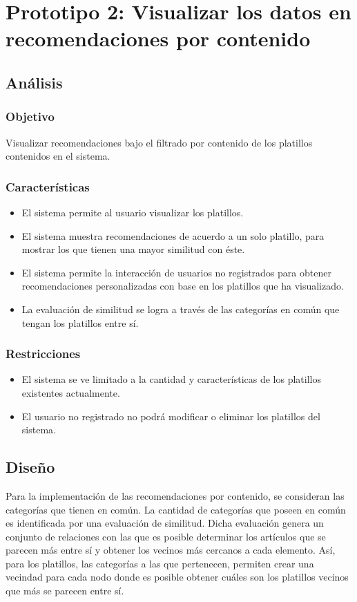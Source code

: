 \chapter{Prototipo 2: Visualizar los datos en recomendaciones por contenido}
  \section{Análisis}
    \subsection{Objetivo}
      Visualizar recomendaciones bajo el filtrado por contenido de los platillos contenidos en el sistema. 

    \subsection{Características}
    \begin{itemize}
      \item El sistema permite al usuario visualizar los platillos.
      \item El sistema muestra recomendaciones de acuerdo a un solo platillo, para mostrar los que tienen una mayor similitud con éste.
      \item El sistema permite la interacción de usuarios no registrados para obtener recomendaciones personalizadas con base en los platillos que ha visualizado.
      \item La evaluación de similitud se logra a través de las categorías en común que tengan los platillos entre sí.
    \end{itemize}

    \subsection{Restricciones}
    \begin{itemize}
      \item El sistema se ve limitado a la cantidad y características de los platillos existentes actualmente.
      \item El usuario no registrado no podrá modificar o eliminar los platillos del sistema.
    \end{itemize}

  \section{Diseño}
    Para la implementación de las recomendaciones por contenido, se consideran las categorías que tienen en común. La cantidad de categorías que poseen en común es identificada por una evaluación de similitud. Dicha evaluación genera un conjunto de relaciones con las que es posible determinar los artículos que se parecen más entre sí y obtener los vecinos más cercanos a cada elemento. Así, para los platillos, las categorías a las que pertenecen, permiten crear una vecindad para cada nodo donde es posible obtener cuáles son los platillos vecinos que más se parecen entre sí.

